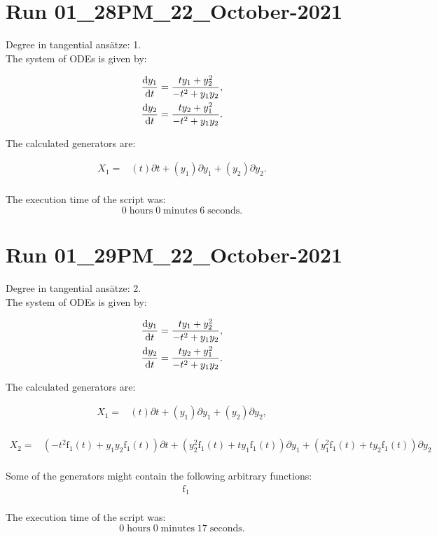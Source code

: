 \section*{Run 01\_28PM\_22\_October-2021}
Degree in tangential ansätze:	1.\\
The system of ODEs is given by:

\begin{align*}
\dv{y_{1}}{t}&=\frac{t y_{1} + y_{2}^{2}}{- t^{2} + y_{1} y_{2}},\\
\dv{y_{2}}{t}&=\frac{t y_{2} + y_{1}^{2}}{- t^{2} + y_{1} y_{2}}.\\
\end{align*}

\noindent The calculated generators are:

\begin{align*}
X_{1}=&\left(t \right)\partial t+\left(y_{1} \right)\partial y_{1}+\left(y_{2} \right)\partial y_{2}.\\
\end{align*}

\noindent The execution time of the script was:
$$0\;\mathrm{hours}\;0\;\mathrm{minutes}\;6 \;\mathrm{seconds}.$$
\section*{Run 01\_29PM\_22\_October-2021}
Degree in tangential ansätze:	2.\\
The system of ODEs is given by:

\begin{align*}
\dv{y_{1}}{t}&=\frac{t y_{1} + y_{2}^{2}}{- t^{2} + y_{1} y_{2}},\\
\dv{y_{2}}{t}&=\frac{t y_{2} + y_{1}^{2}}{- t^{2} + y_{1} y_{2}}.\\
\end{align*}

\noindent The calculated generators are:

\begin{align*}
X_{1}=&\left(t \right)\partial t+\left(y_{1} \right)\partial y_{1}+\left(y_{2} \right)\partial y_{2},\\
\end{align*}

\begin{align*}
X_{2}=&\left(- t^{2} \operatorname{f_{1}}{\left(t \right)}+y_{1} y_{2} \operatorname{f_{1}}{\left(t \right)} \right)\partial t+\left(y_{2}^{2} \operatorname{f_{1}}{\left(t \right)}+t y_{1} \operatorname{f_{1}}{\left(t \right)} \right)\partial y_{1}+\left(y_{1}^{2} \operatorname{f_{1}}{\left(t \right)}+t y_{2} \operatorname{f_{1}}{\left(t \right)} \right)\partial y_{2}\\
\end{align*}



\noindent Some of the generators might contain the following arbitrary functions:
\begin{align*}
&\operatorname{f_{1}}\\
\end{align*}

\noindent The execution time of the script was:
$$0\;\mathrm{hours}\;0\;\mathrm{minutes}\;17 \;\mathrm{seconds}.$$
